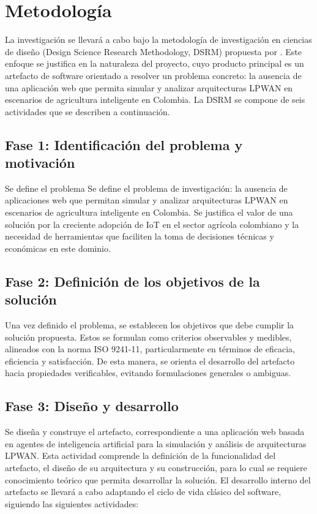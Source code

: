 \chapter{Metodología}

La investigación se llevará a cabo  bajo  la  metodología  de  investigación  en
ciencias de diseño (Design Science Research  Methodology,  DSRM)  propuesta  por
\parencite{peffers2007design}. Este enfoque se justifica en  la  naturaleza  del
proyecto, cuyo producto principal  es  un  artefacto  de  software  orientado  a
resolver un problema concreto: la ausencia de una  aplicación  web  que  permita
simular y analizar arquitecturas LPWAN en escenarios de agricultura  inteligente
en Colombia. La  DSRM  se  compone  de  seis  actividades  que  se  describen  a
continuación.

\section{Fase 1: Identificación del problema y motivación} Se define el problema
Se define el problema de investigación: la  ausencia  de  aplicaciones  web  que
permitan simular y analizar arquitecturas LPWAN  en  escenarios  de  agricultura
inteligente en Colombia. Se justifica el valor de una solución por la  creciente
adopción de IoT en el sector agrícola colombiano y la necesidad de  herramientas
que faciliten la toma de decisiones técnicas y económicas en este dominio.


\section{Fase 2: Definición de los objetivos de la solución} Una vez definido el
problema, se establecen los objetivos que debe cumplir  la  solución  propuesta.
Estos se formulan como criterios observables y medibles, alineados con la  norma
ISO 9241-11, particularmente en términos de eficacia, eficiencia y satisfacción.
De esta manera,  se  orienta  el  desarrollo  del  artefacto  hacia  propiedades
verificables, evitando formulaciones generales o ambiguas.


\section{Fase 3: Diseño y  desarrollo}  Se  diseña  y  construye  el  artefacto,
correspondiente  a  una  aplicación  web  basada  en  agentes  de   inteligencia
artificial para la simulación y análisis de arquitecturas LPWAN. Esta  actividad
comprende la definición de la funcionalidad  del  artefacto,  el  diseño  de  su
arquitectura y su construcción, para lo cual se  requiere  conocimiento  teórico
que permita desarrollar la solución. El  desarrollo  interno  del  artefacto  se
llevará a cabo adaptando el ciclo de vida clásico del  software,  siguiendo  las
siguientes actividades:


